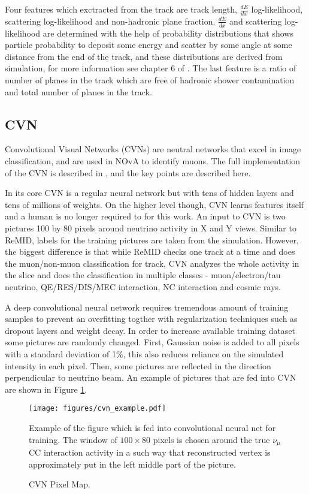 Four features which exctracted from the track are track length, $\frac{dE}{dx}$ log-likelihood, scattering 
log-likelihood and non-hadronic plane fraction. $\frac{dE}{dx}$ and scattering log-likelihood are determined with 
the help of probability distributions that shows particle probability to deposit some energy and scatter by some 
angle at some distance from the end of the track, and these distributions are derived from simulation, for more 
information see chapter 6 of \cite{Nick}. The last feature is a ratio of number of planes in the track which are 
free of hadronic shower contamination and total number of planes in the track. 

\subsection{CVN}
Convolutional Visual Networks (CVNs) are neutral networks that excel in image classification, and are used in
NOvA to identify muons. The full implementation of the CVN is described in \cite{CVN}, and the key points are
described here.

In its core CVN is a regular neural network but with tens of hidden layers and tens of millions of weights. 
On the higher level though, CVN learns features itself and a human is no longer required to for this work.
An input to CVN is two pictures 100 by 80 pixels around neutrino activity in X and Y views. Similar to ReMID, labels 
for the training pictures are taken from the simulation. However, the biggest difference is that while ReMID checks
one track at a time and does the muon/non-muon classification for track, CVN analyzes the whole activity in the 
slice and does the classification in multiple classes - muon/electron/tau neutrino, QE/RES/DIS/MEC interaction, 
NC interaction and cosmic rays.

A deep convolutional neural network requires tremendous amount of training samples to prevent an overfitting togther 
with regularization techniques such as dropout layers \cite{dropout} and weight decay. In order to increase available 
training dataset some pictures are randomly changed. First, Gaussian noise is added to all pixels with a standard 
deviation of 1$\%$, this also reduces reliance on the simulated intensity in each pixel. Then, some pictures 
are reflected in the direction perpendicular to neutrino beam. An example of pictures that are fed into CVN are
shown in Figure \ref{fig:cvn_example}.
\begin{figure}[h]
\texttt{[image: figures/cvn\_example.pdf]}\\%
\caption{CVN Pixel Map.}
{Example of the figure which is fed into convolutional neural net for training. The window of $100\times80$ 
pixels is chosen around the true $\nu_\mu$ CC interaction activity in a such way that reconstructed vertex is 
approximately put in the left middle part of the picture.}
\label{fig:cvn_example}
\end{figure}

